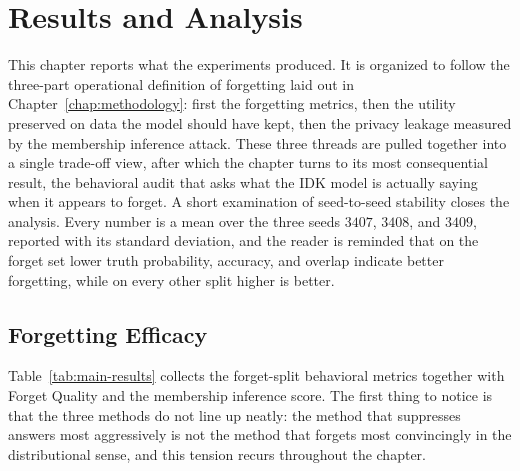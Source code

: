 \documentclass[a4paper,12pt]{report}
\begin{document}
\chapter{Results and Analysis}
\label{chap:results}

This chapter reports what the experiments produced. It is organized to follow the three-part operational definition of forgetting laid out in Chapter~\ref{chap:methodology}: first the forgetting metrics, then the utility preserved on data the model should have kept, then the privacy leakage measured by the membership inference attack. These three threads are pulled together into a single trade-off view, after which the chapter turns to its most consequential result, the behavioral audit that asks what the IDK model is actually saying when it appears to forget. A short examination of seed-to-seed stability closes the analysis. Every number is a mean over the three seeds $3407$, $3408$, and $3409$, reported with its standard deviation, and the reader is reminded that on the forget set lower truth probability, accuracy, and overlap indicate better forgetting, while on every other split higher is better.

\section{Forgetting Efficacy}
\label{sec:res-forget}
Table~\ref{tab:main-results} collects the forget-split behavioral metrics together with Forget Quality and the membership inference score. The first thing to notice is that the three methods do not line up neatly: the method that suppresses answers most aggressively is not the method that forgets most convincingly in the distributional sense, and this tension recurs throughout the chapter.
\end{document}
